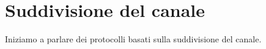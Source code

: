 \section{Suddivisione del canale}
Iniziamo a parlare dei protocolli basati sulla suddivisione del canale.

